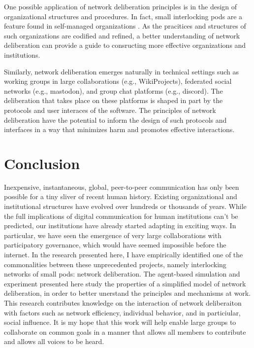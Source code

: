 One possible application of network deliberation principles is in the design of organizational structures and procedures.
In fact, small interlocking pods are a feature found in self-managed organizations \cite{laloux_reinventing_2014}.
As the pracitices and structures of such organizations are codified and refined, a better understanding of network deliberation can provide a guide to consructing more effective organizations and institutions.

Similarly, network deliberation emerges naturally in technical settings such as working groups in large collaborations (e.g., WikiProjects), federated social networks (e.g., mastodon), and group chat platforms (e.g., discord).
The deliberation that takes place on these platforms is shaped in part by the protocols and user interaces of the software.
The principles of network deliberation have the potential to inform the design of such protocols and interfaces in a way that minimizes harm and promotes effective interactions.

\section{Conclusion}
Inexpensive, instantaneous, global, peer-to-peer communication has only been possible for a tiny sliver of recent human history.
Existing organizational and institutional structures have evolved over hundreds or thousands of years.
While the full implications of digital communication for human institutions can't be predicted, our institutions have already started adapting in exciting ways.
In particular, we have seen the emergence of very large collaborations with participatory governance, which would have seemed impossible before the internet.
In the research presented here, I have empirically identified one of the commonalities between these unprecedented projects, namely interlocking networks of small pods: network deliberation.
The agent-based simulation and experiment presented here study the properties of a simplified model of network deliberation, in order to better unerstand the principles and mechanisms at work.
This research contributes knowledge on the interaction of network deliberaiton with factors such as network efficiency, individual behavior, and in particiular, social influence.
It is my hope that this work will help enable large groups to collaborate on common goals in a manner that allows all members to contribute and allows all voices to be heard.
